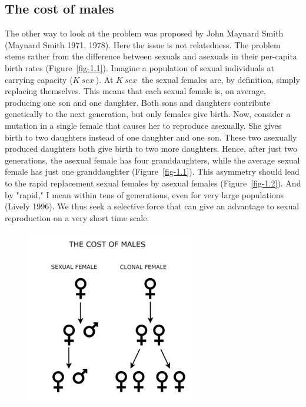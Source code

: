 \documentclass[
  letterpaper,
]{book}
\begin{document}
\hypertarget{the-cost-of-males}{%
\subsection{The cost of males}\label{the-cost-of-males}}

The other way to look at the problem was proposed by John Maynard Smith
(Maynard Smith 1971, 1978). Here the issue is not relatedness. The
problem stems rather from the difference between sexuals and asexuals in
their per-capita birth rates (Figure~\ref{fig-1.1}). Imagine a
population of sexual individuals at carrying capacity (\(K~sex~\)). At
\(K~sex~\) the sexual females are, by definition, simply replacing
themselves. This means that each sexual female is, on average, producing
one son and one daughter. Both sons and daughters contribute genetically
to the next generation, but only females give birth. Now, consider a
mutation in a single female that causes her to reproduce asexually. She
gives birth to two daughters instead of one daughter and one son. These
two asexually produced daughters both give birth to two more daughters.
Hence, after just two generations, the asexual female has four
granddaughters, while the average sexual female has just one
granddaughter (Figure~\ref{fig-1.1}). This asymmetry should lead to the
rapid replacement sexual females by asexual females
(Figure~\ref{fig-1.2}). And by "rapid," I mean within tens of
generations, even for very large populations (Lively 1996). We thus seek
a selective force that can give an advantage to sexual reproduction on a
very short time scale.

\begin{figure}


{\centering \includegraphics{images/fig1-1.jpg}

}

\end{figure}
\end{document}
